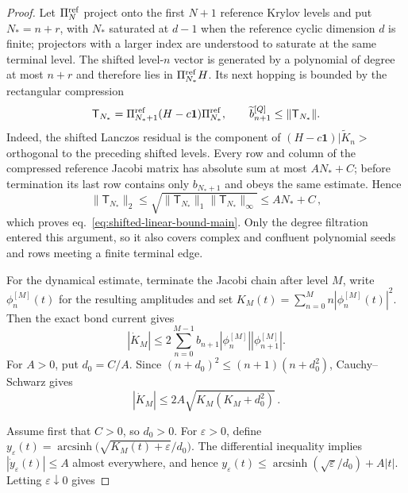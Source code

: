 \documentclass[a4paper,11pt]{article}
\def\ket#1{|#1>}%
\def\cH{H}%
\theoremstyle{definition}
\theoremstyle{remark}
\newcommand{\ket}[1]{|#1\rangle}
\newcommand{\cH}{\mathcal H}
\newcommand{\Id}{\mathbf 1}
\begin{document}
\begin{proof}
Let $\Pi_N^{\rm ref}$ project onto the first $N+1$ reference Krylov levels and put $N_*=n+r$, with $N_*$ saturated at $d-1$ when the
reference cyclic dimension $d$ is finite; projectors with a larger index
are understood to saturate at the same terminal level.  The shifted level-$n$ vector
is generated by a polynomial of degree at most $n+r$ and therefore lies
in $\Pi_{N_*}^{\rm ref}\cH$.  Its next hopping is bounded by the
rectangular compression
\begin{equation}
   \mathsf T_{N_*}
   =\Pi_{N_*+1}^{\rm ref}(H-c\Id)\Pi_{N_*}^{\rm ref},
   \qquad
   \widetilde b_{n+1}^{[Q]}
   \le\|\mathsf T_{N_*}\|.
   \label{eq:rectangular-compression-hopping-main}
\end{equation}
Indeed, the shifted Lanczos residual is the component of
$(H-c\Id)\ket{\widetilde K_n}$ orthogonal to the preceding shifted
levels.  Every row and column of the compressed reference Jacobi matrix
has absolute sum at most $AN_*+C$; before termination its last row
contains only $b_{N_*+1}$ and obeys the same estimate.  Hence
\begin{equation}
   \|\mathsf T_{N_*}\|_2
   \le
   \sqrt{\|\mathsf T_{N_*}\|_1
          \|\mathsf T_{N_*}\|_\infty}
   \le AN_*+C\,,
\end{equation}
which proves eq.~\eqref{eq:shifted-linear-bound-main}.  Only the degree
filtration entered this argument, so it also covers complex and
confluent polynomial seeds and rows meeting a finite terminal edge.

For the dynamical estimate, terminate the Jacobi chain after level $M$,
write $\phi_n^{[M]}(t)$ for the resulting amplitudes and set
$K_M(t)=\sum_{n=0}^{M}n|\phi_n^{[M]}(t)|^2$.  Then the exact bond current gives
\begin{equation}
   |\dot K_M|
   \le2\sum_{n=0}^{M-1}b_{n+1}
      |\phi_n^{[M]}||\phi_{n+1}^{[M]}|.
   \label{eq:finite-truncation-current-bound-main}
\end{equation}
For $A>0$, put $d_0=C/A$.  Since
$(n+d_0)^2\le(n+1)(n+d_0^2)$, Cauchy--Schwarz gives
\begin{equation}
   |\dot K_M|\le2A\sqrt{K_M(K_M+d_0^2)}\,.
\end{equation}

Assume first that $C>0$, so $d_0>0$. For $\varepsilon>0$, define
$y_\varepsilon(t)=\operatorname{arcsinh}\!\bigl(\sqrt{K_M(t)+\varepsilon}/d_0\bigr)$.
The differential inequality implies $|\dot y_\varepsilon(t)|\le A$ almost everywhere, and hence
$y_\varepsilon(t)\le \operatorname{arcsinh}(\sqrt{\varepsilon}/d_0)+A|t|$.
Letting $\varepsilon\downarrow0$ gives%


\end{proof}
\end{document}
